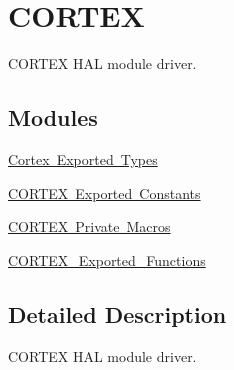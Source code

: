 \hypertarget{group___c_o_r_t_e_x}{}\section{C\+O\+R\+T\+EX}
\label{group___c_o_r_t_e_x}


C\+O\+R\+T\+EX H\+AL module driver.  


\subsection*{Modules}
\begin{DoxyCompactItemize}
\item 
\mbox{\hyperlink{group___c_o_r_t_e_x___exported___types}{Cortex Exported Types}}
\item 
\mbox{\hyperlink{group___c_o_r_t_e_x___exported___constants}{C\+O\+R\+T\+E\+X Exported Constants}}
\item 
\mbox{\hyperlink{group___c_o_r_t_e_x___private___macros}{C\+O\+R\+T\+E\+X Private Macros}}
\item 
\mbox{\hyperlink{group___c_o_r_t_e_x___exported___functions}{C\+O\+R\+T\+E\+X\+\_\+\+Exported\+\_\+\+Functions}}
\end{DoxyCompactItemize}


\subsection{Detailed Description}
C\+O\+R\+T\+EX H\+AL module driver. 

